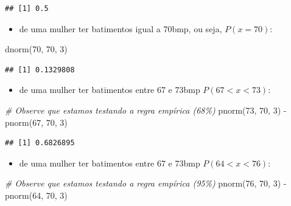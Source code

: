 \documentclass[
]{book}
\newenvironment{Shaded}{\begin{snugshade}}{\end{snugshade}}
\newcommand{\CommentTok}[1]{\textcolor[rgb]{0.56,0.35,0.01}{\textit{#1}}}
\newcommand{\DecValTok}[1]{\textcolor[rgb]{0.00,0.00,0.81}{#1}}
\newcommand{\FunctionTok}[1]{\textcolor[rgb]{0.00,0.00,0.00}{#1}}
\newcommand{\NormalTok}[1]{#1}
\newcommand{\SpecialCharTok}[1]{\textcolor[rgb]{0.00,0.00,0.00}{#1}}
\providecommand{\tightlist}{%
  \setlength{\itemsep}{0pt}\setlength{\parskip}{0pt}}
\begin{document}
\begin{verbatim}
## [1] 0.5
\end{verbatim}

\begin{itemize}
\tightlist
\item
  de uma mulher ter batimentos igual a 70bmp, ou seja, \(P(x=70)\):
\end{itemize}

\begin{Shaded}
\begin{Highlighting}[]
\FunctionTok{dnorm}\NormalTok{(}\DecValTok{70}\NormalTok{, }\DecValTok{70}\NormalTok{, }\DecValTok{3}\NormalTok{)}
\end{Highlighting}
\end{Shaded}

\begin{verbatim}
## [1] 0.1329808
\end{verbatim}

\begin{itemize}
\tightlist
\item
  de uma mulher ter batimentos entre 67 e 73bmp \(P(67 < x < 73)\):
\end{itemize}

\begin{Shaded}
\begin{Highlighting}[]
\CommentTok{\# Observe que estamos testando a regra empírica (68\%)}
\FunctionTok{pnorm}\NormalTok{(}\DecValTok{73}\NormalTok{, }\DecValTok{70}\NormalTok{, }\DecValTok{3}\NormalTok{) }\SpecialCharTok{{-}} \FunctionTok{pnorm}\NormalTok{(}\DecValTok{67}\NormalTok{, }\DecValTok{70}\NormalTok{, }\DecValTok{3}\NormalTok{)}
\end{Highlighting}
\end{Shaded}

\begin{verbatim}
## [1] 0.6826895
\end{verbatim}

\begin{itemize}
\tightlist
\item
  de uma mulher ter batimentos entre 67 e 73bmp \(P(64 < x < 76)\):
\end{itemize}

\begin{Shaded}
\begin{Highlighting}[]
\CommentTok{\# Observe que estamos testando a regra empírica (95\%)}
\FunctionTok{pnorm}\NormalTok{(}\DecValTok{76}\NormalTok{, }\DecValTok{70}\NormalTok{, }\DecValTok{3}\NormalTok{) }\SpecialCharTok{{-}} \FunctionTok{pnorm}\NormalTok{(}\DecValTok{64}\NormalTok{, }\DecValTok{70}\NormalTok{, }\DecValTok{3}\NormalTok{)}
\end{Highlighting}
\end{Shaded}
\end{document}
